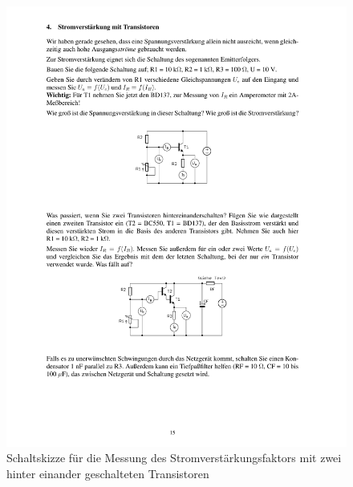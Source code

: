 \documentclass[12pt,a4paper]{article}
\begin{document}
\begin{figure}[H] 
  \centering
    \includegraphics[trim = 10mm 65mm 10mm 174mm, clip, scale = 1]{ep3_14[Page15].pdf}
  	\caption[Schaltskizze für die Messung des Stromverstärkungsfaktors mit zwei hinter einander geschalteten Transistoren]{Schaltskizze für die Messung des Stromverstärkungsfaktors mit zwei hinter einander geschalteten Transistoren\footnotemark}
  \label{fig:5}
\end{figure}
\end{document}
